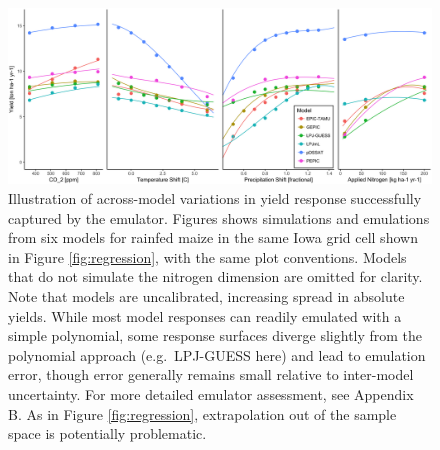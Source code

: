 \documentclass[gmd, manuscript]{copernicus} %
\begin{document}
\begin{figure}[ht]
\centering
    \includegraphics[width=16cm]{figures/regression_model.png}
    \caption{Illustration of across-model variations in yield response successfully captured by the emulator. 
    Figures shows simulations and emulations from six models for rainfed maize in the same Iowa grid cell shown in Figure \ref{fig:regression}, with the same plot conventions. 
    Models that do not simulate the nitrogen dimension are omitted for clarity. 
    Note that models are uncalibrated, increasing spread in absolute yields. 
    While most model responses can readily emulated with a simple polynomial, some response surfaces diverge slightly from the polynomial approach (e.g.\ LPJ-GUESS here) and lead to emulation error, though error generally remains small relative to inter-model uncertainty. 
    For more detailed emulator assessment, see Appendix B. 
    As in Figure \ref{fig:regression}, extrapolation out of the sample space is potentially problematic.}
   \label{fig:regression_iowa}
\end{figure}
\end{document}
